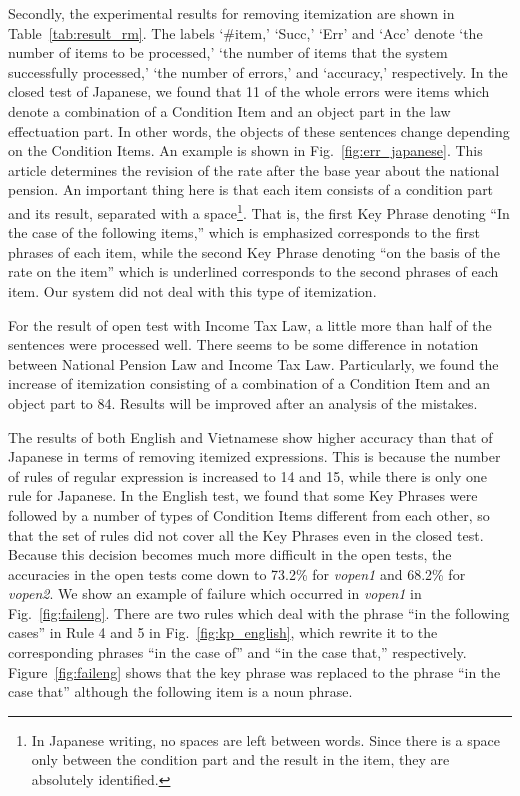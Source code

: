 \documentclass[english]{jnlp_1.4}
\begin{document}
Secondly, the experimental results for removing itemization are shown in Table~\ref{tab:result_rm}.
The labels `\#item,' `Succ,' `Err' and `Acc' denote `the number of items
to be processed,' `the number of items that the system successfully
processed,' `the number of errors,' and `accuracy,' respectively.
In the closed test of Japanese, 
we found that 11 of the whole errors were items which denote a combination
of a Condition Item and an object part in the law effectuation part.
In other words, the objects of these sentences change depending on the
Condition Items.
An example is shown in Fig.~\ref{fig:err_japanese}.
This article determines the revision of the rate after the base year about
the national pension.  An important thing here is that each item
consists of a condition part and its result, separated with a
space\footnote{In Japanese writing, no spaces are left between words.
Since there is a space only between the condition part and the result in the item,
they are absolutely identified.}.
That is, the first Key Phrase denoting ``In the case of the following items,''
which is emphasized corresponds to the first phrases of each item, while
the second Key Phrase denoting ``on the basis of the rate on the item''
which is underlined corresponds to the second phrases of each item.
Our system did not deal with this type of itemization.


For the result of open test with Income Tax Law, a little more than half
of the sentences were processed well. There seems to be some 
difference in notation between National Pension Law and Income Tax
Law. 
Particularly, we found the increase of itemization consisting of a
combination of a Condition Item and an object part to 84.
Results will be improved after an analysis of the mistakes.



The results of both English and Vietnamese show higher accuracy than
that of Japanese in terms of removing itemized expressions.
This is because the number of rules of regular expression is increased
to 14 and 15, while there is only one rule for Japanese.
In the English test, 
we found that some Key Phrases were followed by a number of types of
Condition Items different from each other,
so that the set of rules did not cover all the Key Phrases even in the closed test.
Because this decision becomes much more difficult in the open tests, the
accuracies in the open tests come down to 73.2\% for {\it vopen1} and 68.2\%
for {\it vopen2}.
We show an example of failure which occurred in {\it vopen1} in Fig.~\ref{fig:faileng}.
There are two rules which deal with the phrase ``in the following
cases'' in Rule 4 and 5 in Fig.~\ref{fig:kp_english}, which rewrite it to the corresponding
phrases ``in the case of'' and ``in the case that,'' respectively.
Figure~\ref{fig:faileng} shows that the key phrase was replaced to
the phrase ``in the case that'' although the following item is a noun phrase.
\end{document}
